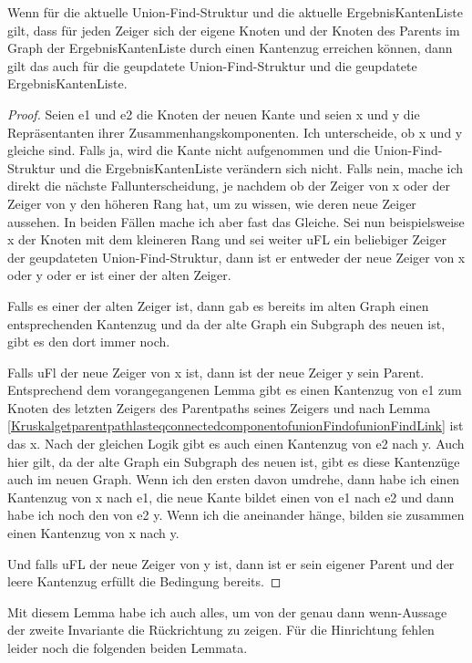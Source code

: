 \begin{lemma}[\KruskalupdateunionFindreachableparent]\label{KruskalupdateunionFindreachableparent}
  Wenn für die aktuelle Union-Find-Struktur und die aktuelle ErgebnisKantenListe gilt,
  dass für jeden Zeiger sich der eigene Knoten und der Knoten des Parents im Graph der ErgebnisKantenListe durch einen Kantenzug erreichen können,
  dann gilt das auch für die geupdatete Union-Find-Struktur und die geupdatete ErgebnisKantenListe.
\end{lemma}
\begin{proof}
  Seien e1 und e2 die Knoten der neuen Kante und seien x und y die Repräsentanten ihrer Zusammenhangskomponenten.
  Ich unterscheide, ob x und y gleiche sind.
  Falls ja, wird die Kante nicht aufgenommen und die Union-Find-Struktur und die ErgebnisKantenListe verändern sich nicht.
  Falls nein, mache ich direkt die nächste Fallunterscheidung, je nachdem ob der Zeiger von x oder der Zeiger von y den höheren Rang hat, um zu wissen, wie deren neue Zeiger aussehen.
  In beiden Fällen mache ich aber fast das Gleiche.
  Sei nun beispielsweise x der Knoten mit dem kleineren Rang und sei weiter uFL ein beliebiger Zeiger der geupdateten Union-Find-Struktur,
  dann ist er entweder der neue Zeiger von x oder y oder er ist einer der alten Zeiger.

  Falls es einer der alten Zeiger ist, dann gab es bereits im alten Graph einen entsprechenden Kantenzug und da der alte Graph ein Subgraph des neuen ist, gibt es den dort immer noch.
  
  Falls uFl der neue Zeiger von x ist, dann ist der neue Zeiger y sein Parent.
  Entsprechend dem vorangegangenen Lemma gibt es einen Kantenzug von e1 zum Knoten des letzten Zeigers des Parentpaths seines Zeigers
  und nach Lemma \ref{KruskalgetparentpathlasteqconnectedcomponentofunionFindofunionFindLink} ist das x.
  Nach der gleichen Logik gibt es auch einen Kantenzug von e2 nach y.
  Auch hier gilt, da der alte Graph ein Subgraph des neuen ist, gibt es diese Kantenzüge auch im neuen Graph.
  Wenn ich den ersten davon umdrehe, dann habe ich einen Kantenzug von x nach e1, die neue Kante bildet einen von e1 nach e2 und dann habe ich noch den von e2 y.
  Wenn ich die aneinander hänge, bilden sie zusammen einen Kantenzug von x nach y.

  Und falls uFL der neue Zeiger von y ist, dann ist er sein eigener Parent und der leere Kantenzug erfüllt die Bedingung bereits.
\end{proof}

Mit diesem Lemma habe ich auch alles, um von der \glqq genau dann wenn\grqq -Aussage der zweite Invariante die Rückrichtung zu zeigen.
Für die Hinrichtung fehlen leider noch die folgenden beiden Lemmata.

